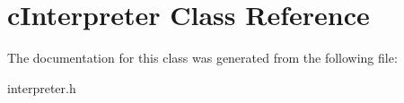 \hypertarget{classcInterpreter}{\section{c\-Interpreter \-Class \-Reference}
\label{classcInterpreter}
}


\-The documentation for this class was generated from the following file\-:\begin{DoxyCompactItemize}
\item 
interpreter.\-h\end{DoxyCompactItemize}
